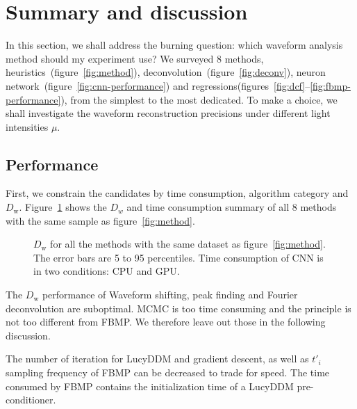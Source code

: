 \section{Summary and discussion}
\label{sec:discussion}

In this section, we shall address the burning question: which waveform analysis method should my experiment use?  We surveyed 8 methods, heuristics~(figure~\ref{fig:method}), deconvolution~(figure~\ref{fig:deconv}), neuron network~(figure~\ref{fig:cnn-performance}) and regressions(figures~\ref{fig:dcf}--\ref{fig:fbmp-performance}), from the simplest to the most dedicated.  To make a choice, we shall investigate the waveform reconstruction precisions under different light intensities $\mu$.

\subsection{Performance}

First, we constrain the candidates by time consumption, algorithm category and $D_\mathrm{w}$.  Figure~\ref{fig:chargesummary} shows the $D_w$ and time consumption summary of all 8 methods with the same sample as figure~\ref{fig:method}.
\begin{figure}[H]
    \centering
    \resizebox{\textwidth}{!}{}
    \caption{\label{fig:chargesummary} $D_\mathrm{w}$ for all the methods with the same dataset as figure~\ref{fig:method}. The error bars are 5 to 95 percentiles. Time consumption of CNN is in two conditions: CPU and GPU. }
\end{figure}
The $D_\mathrm{w}$ performance of Waveform shifting, peak finding and Fourier deconvolution are suboptimal.  MCMC is too time consuming and the principle is not too different from FBMP.  We therefore leave out those in the following discussion.

The number of iteration for LucyDDM and gradient descent, as well as $t'_i$ sampling frequency of FBMP can be decreased to trade for speed. The time consumed by FBMP contains the initialization time of a LucyDDM pre-conditioner. 


